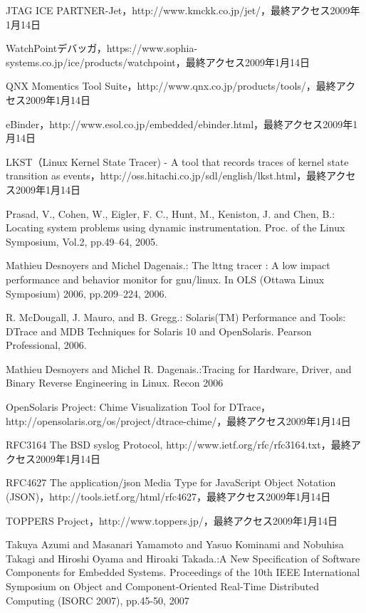 \begin{thebibliography}{99}
JTAG ICE PARTNER-Jet，http://www.kmckk.co.jp/jet/，最終アクセス2009年1月14日

WatchPointデバッガ，https://www.sophia-systems.co.jp/ice/products/watchpoint，最終アクセス2009年1月14日

QNX Momentics Tool Suite，http://www.qnx.co.jp/products/tools/，最終アクセス2009年1月14日

eBinder，http://www.esol.co.jp/embedded/ebinder.html，最終アクセス2009年1月14日

LKST（Linux Kernel State Tracer) - A tool that records
traces of kernel state transition as events，http://oss.hitachi.co.jp/sdl/english/lkst.html，最終アクセス2009年1月14日

Prasad, V., Cohen, W., Eigler, F. C., Hunt, M., Keniston, J. and Chen, B.: Locating system problems using dynamic instrumentation. Proc. of the Linux Symposium, Vol.2, pp.49–64, 2005.

Mathieu Desnoyers and Michel Dagenais.: The lttng tracer : A low impact performance and behavior monitor for gnu/linux. In OLS (Ottawa Linux Symposium) 2006, pp.209–224, 2006.

R. McDougall, J. Mauro, and B. Gregg.: Solaris(TM) Performance and Tools: DTrace and MDB Techniques for Solaris 10 and OpenSolaris. Pearson Professional, 2006.

Mathieu Desnoyers and Michel R. Dagenais.:Tracing for Hardware, Driver, and Binary Reverse Engineering in Linux. Recon 2006

OpenSolaris Project: Chime Visualization Tool for DTrace，http://opensolaris.org/os/project/dtrace-chime/，最終アクセス2009年1月14日

RFC3164 The BSD syslog Protocol, http://www.ietf.org/rfc/rfc3164.txt，最終アクセス2009年1月14日

RFC4627 The application/json Media Type for JavaScript Object Notation (JSON)，http://tools.ietf.org/html/rfc4627，最終アクセス2009年1月14日

TOPPERS Project，http://www.toppers.jp/，最終アクセス2009年1月14日

Takuya Azumi and Masanari Yamamoto and Yasuo Kominami and Nobuhisa Takagi and Hiroshi Oyama and Hiroaki Takada.:A New Specification of Software Components for Embedded Systems. Proceedings of the 10th IEEE International Symposium on Object and Component-Oriented Real-Time Distributed Computing (ISORC 2007), pp.45-50, 2007

\end{thebibliography}
